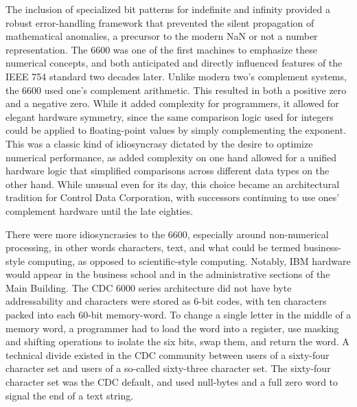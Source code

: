 The inclusion of specialized bit patterns for indefinite and infinity provided a robust error-handling framework that prevented the silent propagation of mathematical anomalies, a precursor to the modern NaN or not a number representation. The 6600 was one of the first machines to emphasize these numerical concepts, and both anticipated and directly influenced features of the IEEE 754 standard two decades later. Unlike modern two’s complement systems, the 6600 used one’s complement arithmetic. This resulted in both a positive zero and a negative zero. While it added complexity for programmers, it allowed for elegant hardware symmetry, since the same comparison logic used for integers could be applied to floating-point values by simply complementing the exponent. This was a classic kind of idiosyncrasy dictated by the desire to optimize numerical performance, as added complexity on one hand allowed for a unified hardware logic that simplified comparisons across different data types on the other hand. While unusual even for its day, this choice became an architectural tradition for Control Data Corporation, with successors continuing to use ones' complement hardware until the late eighties. 

There were more idiosyncrasies to the 6600, especially around non-numerical processing, in other words characters, text, and what could be termed business-style computing, as opposed to scientific-style computing. Notably, IBM hardware would appear in the business school and in the administrative sections of the Main Building. The CDC 6000 series architecture did not have byte addressability and characters were stored as 6-bit codes, with ten characters packed into each 60-bit memory-word. To change a single letter in the middle of a memory word, a programmer had to load the word into a register, use masking and shifting operations to isolate the six bits, swap them, and return the word. A technical divide existed in the CDC community between users of a sixty-four character set and users of a so-called sixty-three character set. The sixty-four character set was the CDC default, and used null-bytes and a full zero word to signal the end of a text string. 

